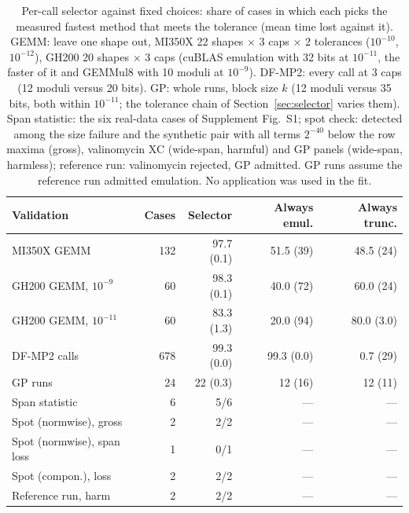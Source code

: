\documentclass[conference]{IEEEtran}
\begin{document}
\begin{table}[t]
\caption{Per-call selector against fixed choices: share of cases in which each picks the measured fastest method that
meets the tolerance (mean time lost against it). GEMM: leave one shape out, MI350X 22 shapes $\times$ 3 caps $\times$ 2
tolerances ($10^{-10}$, $10^{-12}$), GH200 20 shapes $\times$ 3 caps (cuBLAS emulation with 32 bits at $10^{-11}$, the faster of it and GEMMul8 with 10
moduli at $10^{-9}$). DF-MP2: every call at 3 caps (12 moduli versus 20 bits).
GP: whole runs, block size $k$ (12 moduli versus 35 bits, both within $10^{-11}$; the tolerance chain of
Section~\ref{sec:selector} varies them). Span statistic: the six real-data cases of Supplement Fig.~S1; spot check: detected among the size failure and
the synthetic pair with all terms $2^{-40}$ below the row maxima (gross), valinomycin XC (wide-span, harmful) and GP panels (wide-span, harmless); reference
run: valinomycin rejected, GP admitted. GP runs assume the reference run admitted emulation. No application was used in the
fit.}\label{tab:selector}
\centering\footnotesize\setlength{\tabcolsep}{2.6pt}
\begin{tabular}{@{}lrrrr@{}}
\toprule
Validation & Cases & Selector & Always emul. & Always trunc. \\
\midrule
MI350X GEMM & 132 & 97.7 (0.1) & 51.5 (39) & 48.5 (24) \\
GH200 GEMM, $10^{-9}$ & 60 & 98.3 (0.1) & 40.0 (72) & 60.0 (24) \\
GH200 GEMM, $10^{-11}$ & 60 & 83.3 (1.3) & 20.0 (94) & 80.0 (3.0) \\
DF-MP2 calls & 678 & 99.3 (0.0) & 99.3 (0.0) & 0.7 (29) \\
GP runs & 24 & 22 (0.3) & 12 (16) & 12 (11) \\
Span statistic & 6 & 5/6 & --- & --- \\
Spot (normwise), gross & 2 & 2/2 & --- & --- \\
Spot (normwise), span loss & 1 & 0/1 & --- & --- \\
Spot (compon.), loss & 2 & 2/2 & --- & --- \\
Reference run, harm & 2 & 2/2 & --- & --- \\
\bottomrule
\end{tabular}
\end{table}
\end{document}
